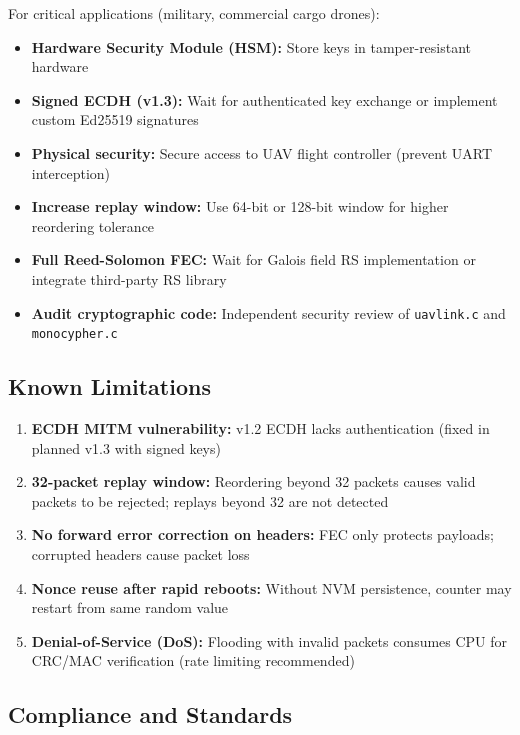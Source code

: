 \documentclass[11pt,a4paper]{article}
\begin{document}
For critical applications (military, commercial cargo drones):

\begin{itemize}[noitemsep]
    \item \textbf{Hardware Security Module (HSM):} Store keys in tamper-resistant hardware
    \item \textbf{Signed ECDH (v1.3):} Wait for authenticated key exchange or implement custom Ed25519 signatures
    \item \textbf{Physical security:} Secure access to UAV flight controller (prevent UART interception)
    \item \textbf{Increase replay window:} Use 64-bit or 128-bit window for higher reordering tolerance
    \item \textbf{Full Reed-Solomon FEC:} Wait for Galois field RS implementation or integrate third-party RS library
    \item \textbf{Audit cryptographic code:} Independent security review of \texttt{uavlink.c} and \texttt{monocypher.c}
\end{itemize}

\subsection{Known Limitations}

\begin{enumerate}[noitemsep]
    \item \textbf{ECDH MITM vulnerability:} v1.2 ECDH lacks authentication (fixed in planned v1.3 with signed keys)
    \item \textbf{32-packet replay window:} Reordering beyond 32 packets causes valid packets to be rejected; replays beyond 32 are not detected
    \item \textbf{No forward error correction on headers:} FEC only protects payloads; corrupted headers cause packet loss
    \item \textbf{Nonce reuse after rapid reboots:} Without NVM persistence, counter may restart from same random value
    \item \textbf{Denial-of-Service (DoS):} Flooding with invalid packets consumes CPU for CRC/MAC verification (rate limiting recommended)
\end{enumerate}

\subsection{Compliance and Standards}
\end{document}
